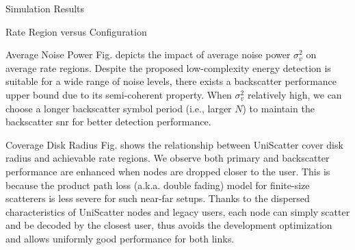 \documentclass[journal]{IEEEtran}
\begin{document}
\begin{section}{Simulation Results}
\begin{subsection}{Rate Region versus Configuration}
		\begin{subsubsection}{Average Noise Power}
			Fig.  depicts the impact of average noise power $\sigma_v^2$ on average rate regions.
			Despite the proposed low-complexity energy detection is suitable for a wide range of noise levels, there exists a backscatter performance upper bound due to its semi-coherent property.
			When $\sigma_v^2$ relatively high, we can choose a longer backscatter symbol period (i.e., larger $N$) to maintain the backscatter \gls{snr} for better detection performance.
		\end{subsubsection}

		\begin{subsubsection}{Coverage Disk Radius}
			Fig.  shows the relationship between UniScatter cover disk radius and achievable rate regions.
			We observe both primary and backscatter performance are enhanced when nodes are dropped closer to the user.
			This is because the product path loss (a.k.a. double fading) model for finite-size scatterers is less severe for such near-far setups.
			Thanks to the dispersed characteristics of UniScatter nodes and legacy users, each node can simply scatter and be decoded by the closest user, thus avoids the development optimization and allows uniformly good performance for both links.
		\end{subsubsection}
	\end{subsection}
	\label{se:simulation_results}
\end{section}
\end{document}
